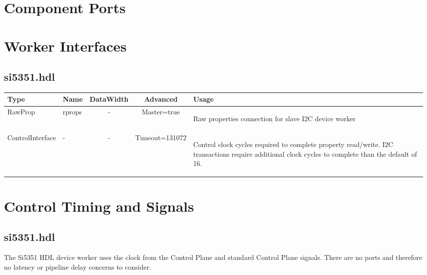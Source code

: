 \documentclass{article}
\def\comp{temp}
\def\comp{si5351}
\def\Comp{TEMP}
\def\Comp{Si5351 }
\begin{document}
\begin{landscape}
\begin{scriptsize}
	\end{scriptsize}

	\section*{Component Ports}
	\begin{scriptsize}
	\end{scriptsize}

	\section*{Worker Interfaces}
	\subsection*{\comp.hdl}
	\begin{scriptsize}
		\begin{tabular}{|M{2cm}|M{1.5cm}|c|c|M{13.85cm}|}
			\hline
			Type & Name & DataWidth & Advanced & Usage \\
			\hline
			RawProp
			& rprops
			& -
			& Master=true
			& \begin{flushleft}Raw properties connection for slave I2C device worker\end{flushleft}\\
			\hline
			ControlInterface
			& -
			& -
			& Timeout=131072
			& \begin{flushleft}Control clock cycles required to complete property  read/write. I2C transactions require additional clock cycles to complete than the default of 16. \end{flushleft}\\
			\hline
		\end{tabular}
	\end{scriptsize}
\end{landscape}

\section*{Control Timing and Signals}
\subsection*{\comp.hdl}
\begin{flushleft}
The \Comp{} HDL device worker uses the clock from the Control Plane and standard Control Plane signals. There are no ports and therefore no latency or pipeline delay concerns to consider.
\end{flushleft}
\end{document}

